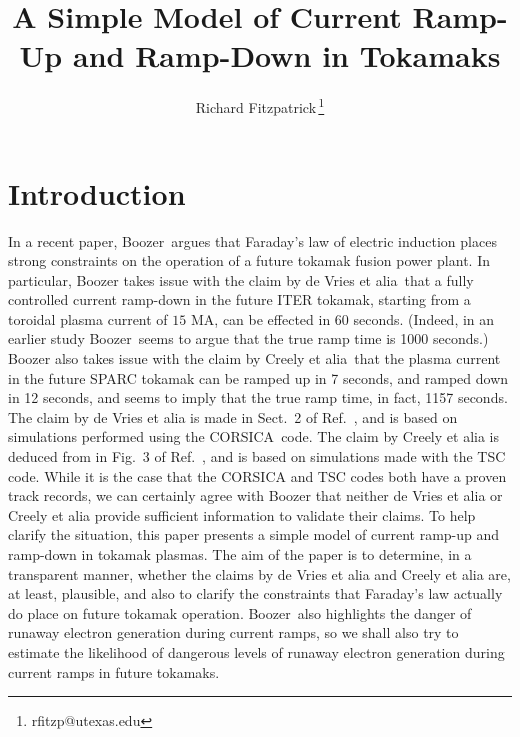 \documentclass[12pt,prb,aps]{revtex4-1}
\begin{document}
\title{A Simple Model of Current Ramp-Up and Ramp-Down in Tokamaks}
\author{Richard Fitzpatrick\,\footnote{rfitzp@utexas.edu}}

\begin{abstract}
\end{abstract}
\maketitle

\section{Introduction}
In a recent paper, Boozer\,\cite{boozer} argues  that Faraday's law of electric induction places strong constraints on the operation of a future  tokamak fusion power plant.
In particular, Boozer takes issue with the claim by de Vries et alia\,\cite{deVries} that a fully controlled current ramp-down in the future ITER tokamak, starting from a toroidal plasma current of $15$ MA,
can be effected in 60 seconds. (Indeed, in an earlier study Boozer\,\cite{boozer1} seems to argue that the true ramp time is 1000 seconds.)  Boozer also takes issue with the claim by Creely et alia\,\cite{creely} that the plasma current in the future SPARC tokamak can be ramped up in
7 seconds, and ramped down in 12 seconds, and seems to imply that the true ramp time, in fact, 1157 seconds. The claim by de Vries et alia is
made in Sect.~2 of Ref.~, and is based on simulations performed using  the CORSICA\,\cite{corsica,corsica1}  code. The claim by Creely et alia is deduced from 
in Fig.~3 of Ref.~, and is based on simulations made with the TSC\,\cite{tsc}   code. While it is the case that the  CORSICA and TSC codes both have a proven 
track records, we can certainly agree with Boozer that neither de Vries et alia or Creely et alia provide sufficient information to validate their claims. 
To help clarify the situation, this paper presents a simple model of current ramp-up and ramp-down in tokamak plasmas. 
The aim of the paper is
to determine, in a transparent manner, whether the claims by de Vries et alia and Creely et alia are, at least, plausible, and also to clarify the constraints that Faraday's law
actually do place on future tokamak operation. Boozer\,\cite{boozer,boozer1}  also highlights the danger
of runaway electron generation during current ramps, so we shall also try to estimate the likelihood of dangerous levels of  runaway electron generation during current ramps
in  future tokamaks.  
\end{document}
